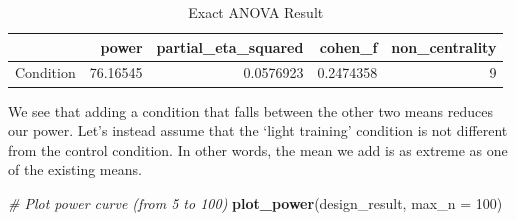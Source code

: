\documentclass[
]{book}
\newenvironment{Shaded}{\begin{snugshade}}{\end{snugshade}}
\newcommand{\CommentTok}[1]{\textcolor[rgb]{0.56,0.35,0.01}{\textit{#1}}}
\newcommand{\DataTypeTok}[1]{\textcolor[rgb]{0.13,0.29,0.53}{#1}}
\newcommand{\DecValTok}[1]{\textcolor[rgb]{0.00,0.00,0.81}{#1}}
\newcommand{\KeywordTok}[1]{\textcolor[rgb]{0.13,0.29,0.53}{\textbf{#1}}}
\newcommand{\NormalTok}[1]{#1}
\newcommand{\OperatorTok}[1]{\textcolor[rgb]{0.81,0.36,0.00}{\textbf{#1}}}
\newcommand{\StringTok}[1]{\textcolor[rgb]{0.31,0.60,0.02}{#1}}
\begin{document}
\begin{table}[!h]

\caption{\label{tab:unnamed-chunk-239}Exact ANOVA Result}
\centering
\begin{tabular}[t]{l|r|r|r|r}
\hline
  & power & partial\_eta\_squared & cohen\_f & non\_centrality\\
\hline
Condition & 76.16545 & 0.0576923 & 0.2474358 & 9\\
\hline
\end{tabular}
\end{table}

We see that adding a condition that falls between the other two means reduces our power. Let's instead assume that the `light training' condition is not different from the control condition. In other words, the mean we add is as extreme as one of the existing means.

\begin{Shaded}
\begin{Highlighting}[]
\CommentTok{# Plot power curve (from 5 to 100)}
\KeywordTok{plot_power}\NormalTok{(design_result, }\DataTypeTok{max_n =} \DecValTok{100}\NormalTok{)}
\end{Highlighting}
\end{Shaded}

\begin{Shaded}
\end{Shaded}
\end{document}
